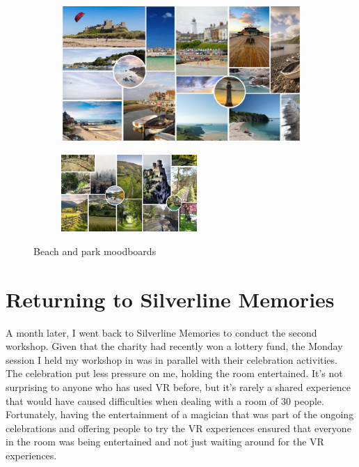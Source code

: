\begin{figure}
\centering
\begin{subfigure}{.5\textwidth}
  \centering
  \includegraphics[width=.8\linewidth]{Images/MoodboardOne.png}
  \label{fig:moodboardOne}
\end{subfigure}%
\begin{subfigure}{.5\textwidth}
  \centering
  \includegraphics[width=.8\linewidth]{Images/MoodboardTwo.png}
  \label{fig:moodboardTwo}
\end{subfigure}
\caption{Beach and park moodboards}
\label{fig:VRMoodboards}
\end{figure}

\section{Returning to Silverline Memories}
\label{Relationships:Returning}
A month later, I went back to Silverline Memories to conduct the second workshop. Given that the charity had recently won a lottery fund, the Monday session I held my workshop in was in parallel with their celebration activities. The celebration put less pressure on me, holding the room entertained. It's not surprising to anyone who has used VR before, but it's rarely a shared experience that would have caused difficulties when dealing with a room of 30 people. Fortunately, having the entertainment of a magician that was part of the ongoing celebrations and offering people to try the VR experiences ensured that everyone in the room was being entertained and not just waiting around for the VR experiences.

